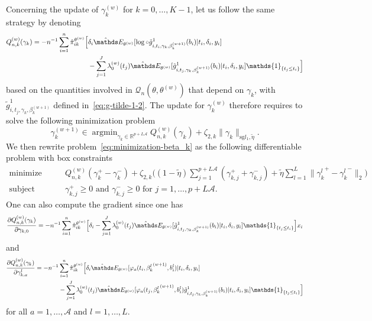 \documentclass[11pt]{article}
\DeclareMathOperator{\argmin}{argmin}
\newcommand{\ind}[1]{\mathds{1}_{#1}}
\newcommand{\norm}[1]{\|#1\|}
\newcommand{\cQ}{\mathcal Q}
\newcommand{\R}{\mathds R}
\newcommand{\E}{\mathds E}
\begin{document}
Concerning the update of $\gamma_k^{(w)}$ for $k=0, \ldots, K-1$, let us follow the same strategy by denoting
\begin{align*}
  Q^{(w)}_{n,k}(\gamma_k) = -n^{-1} \sum_{i=1}^n \hat \pi_{ik}^{\theta^{(w)}} \Big[ &\delta_i \hat \E_{\theta^{(w)}}[ \log \circ \tilde g_{i, t_i, \gamma_k, \beta_k^{(w+1)}}^1(b_i) | t_i, \delta_i, y_i] \\
  & - \sum_{j=1}^J \lambda_0^{(w)}(t_j) \hat \E_{\theta^{(w)}}[ \tilde g_{i, t_j, \gamma_k, \beta_k^{(w+1)}}^1(b_i) | t_i, \delta_i, y_i] \ind{\{t_j\leq t_i\}} \Big] 
\end{align*}
based on the quantities involved in $\cQ_n(\theta, \theta^{(w)})$ that depend on $\gamma_k$, with $\tilde g_{i, t_j, \gamma_k, \beta_k^{(w+1)}}^1$ defined in~\eqref{eq:g-tilde-1-2}. The update for $\gamma_k^{(w)}$ therefore requires to solve the following minimization problem
\begin{equation}
  \label{eq:minimization-beta_k}
  \gamma_k^{(w+1)} \in \argmin_{\gamma_k \in \R^{p+L\mathcal{A}}} Q^{(w)}_{n,k}(\gamma_k) + \zeta_{2,k} \norm{\gamma_k}_{\text{sg} l_1, \tilde{\eta}}.
\end{equation}
We then rewrite problem~\eqref{eq:minimization-beta_k} as the following differentiable problem with box constraints
\begin{equation}
  \label{eq:sub-problem-gamma_k}
  \begin{split}
    \text{minimize}& \quad \quad Q_{n, k}^{(w)}(\gamma_k^+ - \gamma_k^-) + \zeta_{2,k} \big((1 - \tilde \eta) \sum_{j=1}^{p+L\mathcal{A}} (\gamma_{k,j}^+ + \gamma_{k,j}^-) + \tilde \eta \sum_{l=1}^L \norm{{\gamma_k^l}^+ - {\gamma_k^l}^-}_2 \big) \\
    \text{subject to}& \quad \quad \gamma_{k,j}^+ \geq 0 \text{ and } \gamma_{k,j}^- \geq 0 \text{ for } j = 1, \ldots, p+L\mathcal{A}.
  \end{split} 
\end{equation}
One can also compute the gradient since one has
\begin{equation}
  \label{eq:grad-Q-1}
  \frac{\partial Q_{n,k}^{(w)}(\gamma_k)}{\partial \gamma_{k,0}} = -n^{-1} \sum_{i=1}^n \hat \pi_{ik}^{\theta^{(w)}} \Big[ \delta_i - \sum_{j=1}^J \lambda_0^{(w)}(t_j) \hat \E_{\theta^{(w)}}[ \tilde g_{i, t_j, \gamma_k, \beta_k^{(w+1)}}^1(b_i) | t_i, \delta_i, y_i] \ind{\{t_j\leq t_i\}} \Big] x_i
\end{equation}
and
\begin{align}
  \label{eq:grad-Q-2}
  \frac{\partial Q_{n,k}^{(w)}(\gamma_k)}{\partial \gamma_{k,a}^l} = -n^{-1} &\sum_{i=1}^n \hat \pi_{ik}^{\theta^{(w)}} \Big[ \delta_i  \hat \E_{\theta^{(w)}}[ \varphi_a(t_i, {\beta_k^l}^{(w+1)}, b_i^l) | t_i, \delta_i, y_i] \\ \nonumber
   &- \sum_{j=1}^J \lambda_0^{(w)}(t_j) \hat \E_{\theta^{(w)}}[ \varphi_a(t_j, {\beta_k^l}^{(w+1)}, b_i^l) \tilde g_{i, t_j, \gamma_k, \beta_k^{(w+1)}}^1(b_i) | t_i, \delta_i, y_i] \ind{\{t_j\leq t_i\}} \Big]
\end{align}
for all $a = 1, \ldots, \mathcal{A}$ and $l = 1, \ldots, L$.
\end{document}
